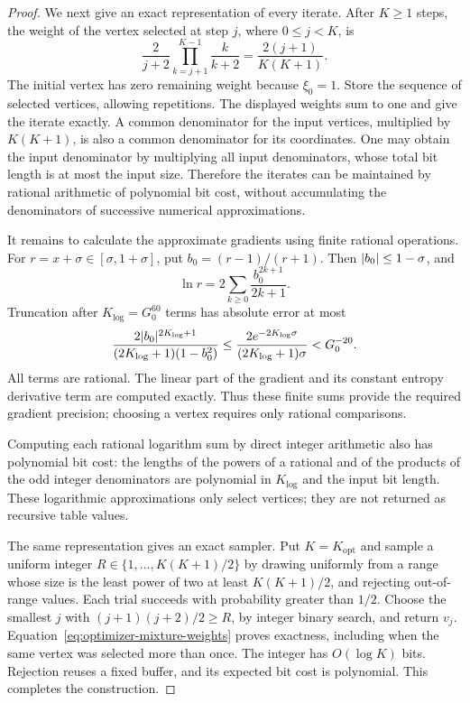 \begin{proof}
We next give an exact representation of every iterate.  After $K\ge1$
steps, the weight of the vertex selected at step $j$, where $0\le j<K$,
is
\begin{equation}
 \frac{2}{j+2}\prod_{k=j+1}^{K-1}\frac{k}{k+2}
 =\frac{2(j+1)}{K(K+1)}.
 \label{eq:optimizer-mixture-weights}
\end{equation}
The initial vertex has zero remaining weight because $\xi_0=1$.
Store the sequence of selected vertices, allowing repetitions.  The
displayed weights sum to one and give the iterate exactly.  A common
denominator for the input vertices, multiplied by $K(K+1)$, is also a
common denominator for its coordinates.  One may obtain the input
denominator by multiplying all input denominators, whose total bit
length is at most the input size.  Therefore the iterates can be
maintained by rational arithmetic of polynomial bit cost, without
accumulating the denominators of successive numerical approximations.

It remains to calculate the approximate gradients using finite
rational operations.
For $r=x+\sigma\in[\sigma,1+\sigma]$, put
$b_0=(r-1)/(r+1)$.  Then $\lvert b_0\rvert\le1-\sigma$, and
\[
 \ln r=2\sum_{k\ge0}\frac{b_0^{2k+1}}{2k+1}.
\]
Truncation after $K_{\log}=G_0^{60}$ terms has absolute error at most
\[
 \frac{2\lvert b_0\rvert^{2K_{\log}+1}}
      {(2K_{\log}+1)(1-b_0^2)}
 \le
 \frac{2e^{-2K_{\log}\sigma}}
      {(2K_{\log}+1)\sigma}
 <G_0^{-20}.
\]
All terms are rational.  The linear part of the gradient and its
constant entropy derivative term are computed exactly.  Thus these
finite sums provide the required gradient precision; choosing a
vertex requires only rational comparisons.

Computing each rational logarithm sum by direct integer arithmetic
also has polynomial bit cost: the lengths
of the powers of a rational and of the products of the odd integer
denominators are polynomial in $K_{\log}$ and the input bit length.
These logarithmic approximations only select vertices; they are not
returned as recursive table values.

The same representation gives an exact sampler.  Put
$K=K_{\mathrm{opt}}$ and sample a uniform integer
$R\in\{1,\ldots,K(K+1)/2\}$ by drawing uniformly from a range whose
size is the least power of two at least $K(K+1)/2$, and rejecting
out-of-range values.  Each trial
succeeds with probability greater than $1/2$.  Choose the smallest
$j$ with $(j+1)(j+2)/2\ge R$, by integer binary search, and return
$v_j$.  Equation~\eqref{eq:optimizer-mixture-weights} proves exactness,
including when the same vertex was selected more than once.  The
integer has $O(\log K)$ bits.  Rejection reuses a fixed buffer, and
its expected bit cost is polynomial.  This completes the construction.
\end{proof}

